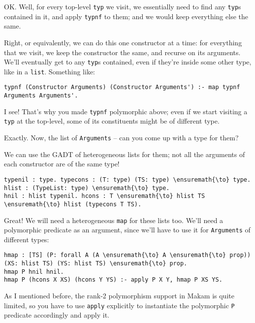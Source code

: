 \heroSTUDENT{} OK. Well, for every top-level \texttt{typ} we visit, we
essentially need to find any \texttt{typ}s contained in it, and apply
\texttt{typnf} to them; and we would keep everything else the same.

\heroADVISOR{} Right, or equivalently, we can do this one constructor at a
time: for everything that we visit, we keep the constructor the same,
and recurse on its arguments. We'll eventually get to any \texttt{typ}s
contained, even if they're inside some other type, like in a
\texttt{list}. Something like:

\begin{verbatim}
typnf (Constructor Arguments) (Constructor Arguments') :- map typnf Arguments Arguments'.
\end{verbatim}

\heroSTUDENT{} I see! That's why you made \texttt{typnf} polymorphic above;
even if we start visiting a \texttt{typ} at the top-level, some of its
constituents might be of different type.

\heroADVISOR{} Exactly. Now, the list of \texttt{Arguments} -- can you come up
with a type for them?

\heroSTUDENT{} We can use the GADT of heterogeneous lists for them; not all
the arguments of each constructor are of the same type!

\begin{verbatim}
typenil : type. typecons : (T: type) (TS: type) \ensuremath{\to} type.
hlist : (TypeList: type) \ensuremath{\to} type.
hnil : hlist typenil. hcons : T \ensuremath{\to} hlist TS \ensuremath{\to} hlist (typecons T TS).
\end{verbatim}

\heroADVISOR{} Great! We will need a heterogeneous \texttt{map} for these
lists too. We'll need a polymorphic predicate as an argument, since
we'll have to use it for \texttt{Arguments} of different types:

\begin{verbatim}
hmap : [TS] (P: forall A (A \ensuremath{\to} A \ensuremath{\to} prop)) (XS: hlist TS) (YS: hlist TS) \ensuremath{\to} prop.
hmap P hnil hnil.
hmap P (hcons X XS) (hcons Y YS) :- apply P X Y, hmap P XS YS.
\end{verbatim}

As I mentioned before, the rank-2 polymorphism support in Makam is quite
limited, so you have to use \texttt{apply} explicitly to instantiate the
polymorphic \texttt{P} predicate accordingly and apply it.

